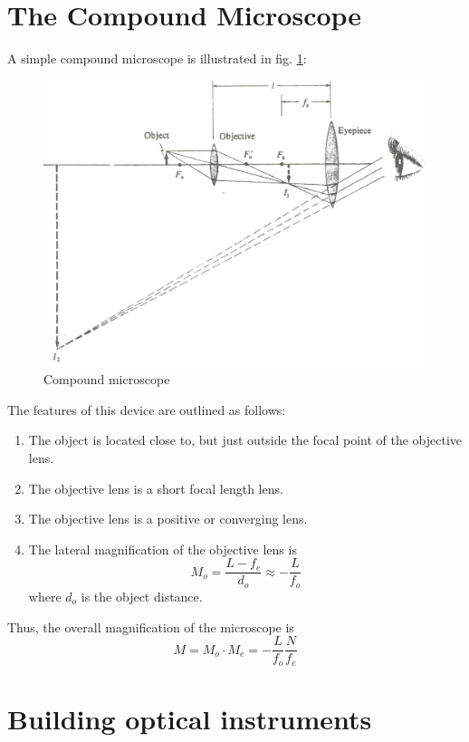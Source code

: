\section{The Compound Microscope}
A simple compound microscope is illustrated in fig. \ref{f:mscope}:

\begin{figure} [htb] %
  \centering
  \includegraphics[scale=0.6]{5bgraf/mscope}
  \caption{Compound microscope}
  \label{f:mscope}
\end{figure} %

The features of this device are outlined as follows:
\begin{enumerate}
	\item The object is located close to, but just outside the focal point of the objective lens.
	\item The objective lens is a short focal length lens.
	\item The objective lens is a positive or converging lens. 
	\item The lateral magnification of the objective lens is
	\[
		M_o = \frac{L-f_e }{d_o}\approx -\frac{L}{f_o}
	\] 
	where $d_o$ is the object distance.
\end{enumerate}

Thus, the overall magnification of the microscope is
\begin{equation} \label{e:mscope}
	M = M_o \cdot M_e = -\frac{L}{f_o}\frac{N}{f_e}
\end{equation}


\section{Building optical instruments}
